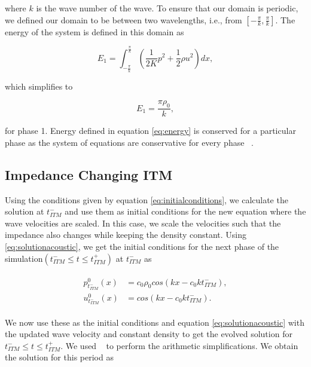 where $k$ is the wave number of the wave. To ensure that our domain is periodic, we defined our domain to be between two wavelengths, i.e., from 
$\left[-\frac{\pi}{k}, \frac{\pi}{k}\right]$. The energy of the system is defined in this domain as ~\parencite{Kopriva2021}

\begin{equation}
     E_1 = \int_{-\frac{\pi}{k}}^{\frac{\pi}{k}} \left(\frac{1}{2K}p^2 + \frac{1}{2}\rho u^2\right) dx,
    \label{eq:energy}
\end{equation}

which simplifies to 

\begin{equation}
    E_1 = \frac{\pi\rho_0}{k},
\end{equation}

for phase 1. Energy defined in equation \ref{eq:energy} is conserved for a particular phase as the system of equations are conservative for every phase ~\parencite{Kopriva2021}. 

\subsection{Impedance Changing \ac{ITM}}\label{section:impedanceconstantITM}
Using the conditions given by equation \ref{eq:initialconditions}, we calculate the solution at $t_{ITM}^-$ and use them as initial conditions for the new equation where the wave velocities are scaled.
In this case, we scale the velocities such that the impedance also changes while keeping the density constant. Using \ref{eq:solutionacoustic}, we get the initial conditions for the next phase of the simulation$\left(t_{ITM}^- \leq t \leq t_{ITM}^+ \right)$ at $t_{ITM}^-$ as

\begin{align}
    \begin{split}
        p^0_{t_{ITM}^-}\left(x\right) &= c_0 \rho_0 cos\left(kx - c_0kt_{ITM}^-\right), \\
        u^0_{t_{ITM}^-}\left(x\right) &= cos\left(kx - c_0kt_{ITM}^-\right) .
    \end{split}
\end{align}

We now use these as the initial conditions and equation \ref{eq:solutionacoustic} with the updated wave velocity and constant density to get the evolved solution for $t_{ITM}^- \leq t \leq t_{ITM}^+ $. We used ~\parencite{sagemath} to perform the arithmetic simplifications. We obtain the solution for this period as


